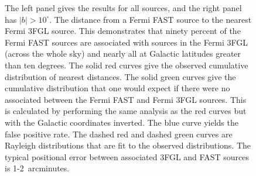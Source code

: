 \documentclass[useAMS,usenatbib]{mn2e}
\begin{document}
\begin{figure}
\caption{The left panel gives the results for all sources, and the right
  panel has $|b|>10^\circ$. The distance from a Fermi FAST source to
  the nearest Fermi 3FGL source.  This demonstrates that ninety
  percent of the Fermi FAST sources are associated with sources in the
  Fermi 3FGL (across the whole sky) and nearly all at Galactic
  latitudes greater than ten degrees. The solid red curves give the
  observed cumulative distribution of nearest distances.  The solid green
  curves give the cumulative distribution that one would expect if
  there were no associated between the Fermi FAST and Fermi 3FGL
  sources.  This is calculated by performing the same analysis as the
  red curves but with the Galactic coordinates inverted.  The blue
  curve yields the false positive rate.  The dashed red and dashed green curves
  are Rayleigh distributions that are fit to the observed
  distributions.  The typical positional error between associated 3FGL
  and FAST sources is 1-2~arcminutes.  }
\label{fig:corresponances}
\end{figure}
\end{document}
